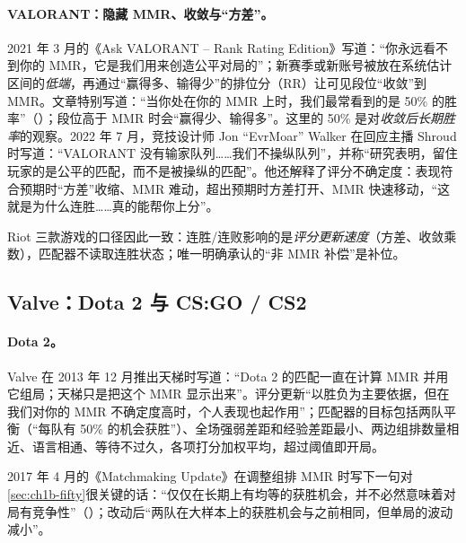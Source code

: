 \paragraph{VALORANT：隐藏 MMR、收敛与“方差”。}
2021 年 3 月的《Ask VALORANT – Rank Rating Edition》写道：“你永远看不到你的 MMR，它是我们用来创造公平对局的”；新赛季或新账号被放在系统估计区间的\emph{低端}，再通过“赢得多、输得少”的排位分（RR）让可见段位“收敛”到 MMR\cite{riot2021valorantrr}\tagOff。文章特别写道：“当你处在你的 MMR 上时，我们最常看到的是 50\% 的胜率”（）；段位高于 MMR 时会“赢得少、输得多”\tagOff。这里的 50\% 是对\emph{收敛后长期胜率}的观察。2022 年 7 月，竞技设计师 Jon “EvrMoar” Walker 在回应主播 Shroud 时写道：“VALORANT 没有输家队列……我们不操纵队列”，并称“研究表明，留住玩家的是公平的匹配，而不是被操纵的匹配”\cite{koh2022valorant}\tagOff。他还解释了评分不确定度：表现符合预期时“方差”收缩、MMR 难动，超出预期时方差打开、MMR 快速移动，“这就是为什么连胜……真的能帮你上分”\cite{oneesports2024valorant}\tagOff。

Riot 三款游戏的口径因此一致：连胜/连败影响的是\emph{评分更新速度}（方差、收敛乘数），匹配器不读取连胜状态；唯一明确承认的“非 MMR 补偿”是补位。

\subsection{Valve：Dota 2 与 CS:GO / CS2}
\label{sec:ch1b-valve}

\paragraph{Dota 2。}
Valve 在 2013 年 12 月推出天梯时写道：“Dota 2 的匹配一直在计算 MMR 并用它组局；天梯只是把这个 MMR 显示出来”\cite{pcgamesn2013dota}\tagOff{}。评分更新“以胜负为主要依据，但在我们对你的 MMR 不确定度高时，个人表现也起作用”；匹配器的目标包括两队平衡（“每队有 50\% 的机会获胜”）、全场强弱差距和经验差距最小、两边组排数量相近、语言相通、等待不过久，各项打分加权平均，超过阈值即开局\tagOff。

2017 年 4 月的《Matchmaking Update》在调整组排 MMR 时写下一句对\cref{sec:ch1b-fifty}很关键的话：“仅仅在长期上有均等的获胜机会，并不必然意味着对局有竞争性”（）；改动后“两队在大样本上的获胜机会与之前相同，但单局的波动减小”\cite{valve2017matchmaking}\tagOff。

